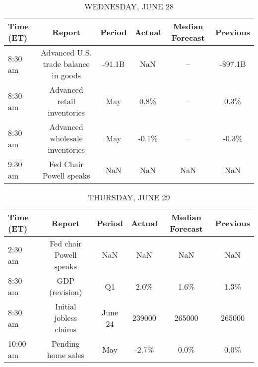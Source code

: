 \documentclass{article}%
\begin{document}
\begin{table}[htbp]%
\caption{WEDNESDAY, JUNE 28}%
\centering%
\begin{adjustbox}{width=1\textwidth}%
\begin{tabular}{lccccc}
\toprule
Time (ET) &                               Report & Period & Actual & Median Forecast & Previous \\
\midrule
  8:30 am & Advanced U.S. trade balance in goods & -91.1B &    NaN &              -- &  -\$97.1B \\
  8:30 am &          Advanced retail inventories &    May &   0.8\% &              -- &     0.3\% \\
  8:30 am &       Advanced wholesale inventories &    May &  -0.1\% &              -- &    -0.3\% \\
  9:30 am &              Fed Chair Powell speaks &    NaN &    NaN &             NaN &      NaN \\
\bottomrule
\end{tabular}
%
\end{adjustbox}%
\end{table}

%


\begin{table}[htbp]%
\caption{THURSDAY, JUNE 29}%
\centering%
\begin{adjustbox}{width=1\textwidth}%
\begin{tabular}{lccccc}
\toprule
Time (ET) &                  Report &  Period & Actual & Median Forecast & Previous \\
\midrule
  2:30 am & Fed chair Powell speaks &     NaN &    NaN &             NaN &      NaN \\
  8:30 am &          GDP (revision) &      Q1 &   2.0\% &            1.6\% &     1.3\% \\
  8:30 am &  Initial jobless claims & June 24 & 239000 &          265000 &   265000 \\
 10:00 am &      Pending home sales &     May &  -2.7\% &            0.0\% &     0.0\% \\
\bottomrule
\end{tabular}
%
\end{adjustbox}%
\end{table}

%
\end{document}
